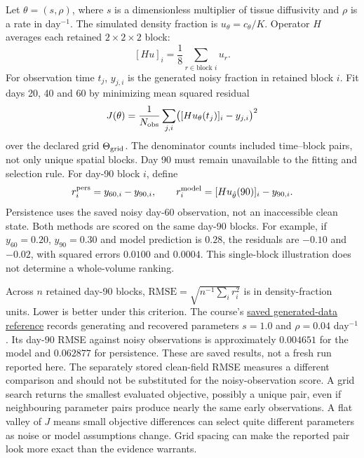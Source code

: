 Let $\theta=(s,\rho)$, where $s$ is a dimensionless multiplier of tissue diffusivity and $\rho$ is a rate in day$^{-1}$. The simulated density fraction is $u_\theta=c_\theta/K$. Operator $H$ averages each retained $2\times2\times2$ block:
\[
[Hu]_i=\frac18\sum_{r\in\text{block }i}u_r.
\]
For observation time $t_j$, $y_{j,i}$ is the generated noisy fraction in retained block $i$. Fit days 20, 40 and 60 by minimizing mean squared residual
\[
J(\theta)=\frac1{N_{\rm obs}}\sum_{j,i}
\bigl([Hu_\theta(t_j)]_i-y_{j,i}\bigr)^2
\]
over the declared grid $\Theta_{\rm grid}$. The denominator counts included time--block pairs, not only unique spatial blocks. Day 90 must remain unavailable to the fitting and selection rule.
For day-90 block $i$, define
\[
r_i^{\rm pers}=y_{60,i}-y_{90,i},\qquad
r_i^{\rm model}=[Hu_{\hat\theta}(90)]_i-y_{90,i}.
\]
Persistence uses the saved noisy day-60 observation, not an inaccessible clean state. Both methods are scored on the same day-90 blocks. For example, if $y_{60}=0.20$, $y_{90}=0.30$ and model prediction is $0.28$, the residuals are $-0.10$ and $-0.02$, with squared errors $0.0100$ and $0.0004$. This single-block illustration does not determine a whole-volume ranking.

Across $n$ retained day-90 blocks, $\mathrm{RMSE}=\sqrt{n^{-1}\sum_i r_i^2}$ is in density-fraction units. Lower is better under this criterion.
The course's \href{https://github.com/arvidl/brains-to-models/blob/main/paper/figures/growth_extension_values.json}{saved generated-data reference} records generating and recovered parameters $s=1.0$ and $\rho=0.04$ day$^{-1}$. Its day-90 RMSE against noisy observations is approximately $0.004651$ for the model and $0.062877$ for persistence. These are saved results, not a fresh run reported here. The separately stored clean-field RMSE measures a different comparison and should not be substituted for the noisy-observation score.
A grid search returns the smallest evaluated objective, possibly a unique pair, even if neighbouring parameter pairs produce nearly the same early observations. A flat valley of $J$ means small objective differences can select quite different parameters as noise or model assumptions change. Grid spacing can make the reported pair look more exact than the evidence warrants.

